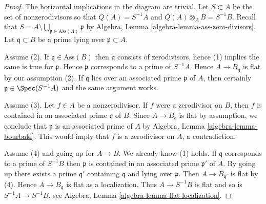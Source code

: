 \begin{proof}
The horizontal implications in the diagram are trivial.
Let $S \subset A$ be the set of nonzerodivisors so that
$Q(A) = S^{-1}A$ and $Q(A) \otimes_A B = S^{-1}B$. Recall that
$S = A \setminus \bigcup_{\mathfrak p \in \text{Ass}(A)} \mathfrak p$
by Algebra, Lemma \ref{algebra-lemma-ass-zero-divisors}.
Let $\mathfrak q \subset B$ be a prime lying over $\mathfrak p \subset A$.

\medskip\noindent
Assume (2). If $\mathfrak q \in \text{Ass}(B)$ then
$\mathfrak q$ consists of zerodivisors, hence (1) implies
the same is true for $\mathfrak p$. Hence
$\mathfrak p$ corresponds to a prime of $S^{-1}A$.
Hence $A \to B_\mathfrak q$ is flat by our assumption (2).
If $\mathfrak q$ lies over an associated prime $\mathfrak p$
of $A$, then certainly $\mathfrak p \in \Spec(S^{-1}A)$ and the
same argument works.

\medskip\noindent
Assume (3). Let $f \in A$ be a nonzerodivisor. If $f$ were a zerodivisor
on $B$, then $f$ is contained in an associated prime $\mathfrak q$
of $B$. Since $A \to B_\mathfrak q$ is flat by assumption, we conclude that
$\mathfrak p$ is an associated prime of $A$ by
Algebra, Lemma \ref{algebra-lemma-bourbaki}. This would imply that
$f$ is a zerodivisor on $A$, a contradiction.

\medskip\noindent
Assume (4) and going up for $A \to B$. We already know (1) holds.
If $\mathfrak q$ corresponds to a prime of $S^{-1}B$ then $\mathfrak p$
is contained in an associated prime $\mathfrak p'$ of $A$. By going up
there exists a prime $\mathfrak q'$ containing $\mathfrak q$ and lying
over $\mathfrak p$. Then $A \to B_{\mathfrak q'}$ is flat by
(4). Hence $A \to B_{\mathfrak q}$ is flat as a localization.
Thus $A \to S^{-1}B$ is flat and so is $S^{-1}A \to S^{-1}B$, see
Algebra, Lemma \ref{algebra-lemma-flat-localization}.
\end{proof}

